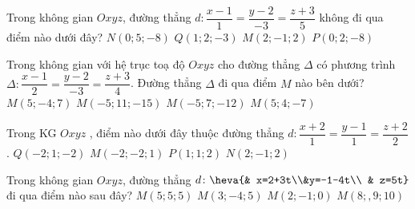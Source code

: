 \begin{ex}%
	Trong không gian $ Oxyz$, đường thẳng $ d\colon \dfrac{x-1}{1}=\dfrac{y-2}{-3}=\dfrac{z+3}{5}$ không đi qua điểm nào dưới đây?
	\choice
	{$ N(0;5;-8)$}
	{$ Q(1;2;-3)$}
	{$ M(2;-1;2)$}
	{\True $P(0;2;-8)$}
\end{ex}

\begin{ex}%
	Trong không gian với hệ trục toạ độ $Oxyz$ cho đường thẳng $\Delta $ có phương trình $\Delta \colon \dfrac{x-1}{2}=\dfrac{y-2}{-3}=\dfrac{z+3}{4}$. Đường thẳng $\Delta $ đi qua điểm $M$ nào bên dưới?
	\choice
	{$M\left(5;-4;7\right)$}
	{\True $M\left(-5;11;-15\right)$}
	{$M\left(-5;7;-12\right)$}
	{$M\left(5;4;-7\right)$}
\end{ex}

\begin{ex}%
	Trong KG $Oxyz$ , điểm nào dưới đây thuộc đường thẳng $d\colon\dfrac{x+2}{1}=\dfrac{y-1}{1}=\dfrac{z+2}{2}$.
	\choice
	{\True $Q\left(-2;1;-2\right)$}
	{$M\left(-2;-2;1\right)$}
	{$P\left(1;1;2\right)$}
	{$N\left(2;-1;2\right)$}
\end{ex}

\begin{ex}%
	Trong không gian $ Oxyz$, đường thẳng $d\colon \heva{& x=2+3t\\&y=-1-4t\\ & z=5t}$ đi qua điểm nào sau đây?
	\choice
	{$M\left(5;5;5\right)$}
	{$M\left(3;-4;5\right)$}
	{\True $M\left(2;-1;0\right)$}
	{$M\left(8;,9;10\right)$}
\end{ex}

